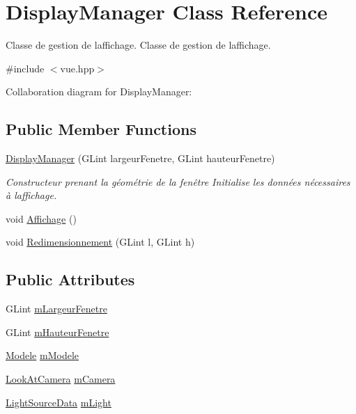\hypertarget{class_display_manager}{}\section{Display\+Manager Class Reference}
\label{class_display_manager}


Classe de gestion de l\textquotesingle{}affichage. Classe de gestion de l\textquotesingle{}affichage.  




{\ttfamily \#include $<$vue.\+hpp$>$}



Collaboration diagram for Display\+Manager\+:
\subsection*{Public Member Functions}
\begin{DoxyCompactItemize}
\item 
\hyperlink{class_display_manager_abf11523503126b8ee8ed26d79aba9974}{Display\+Manager} (G\+Lint largeur\+Fenetre, G\+Lint hauteur\+Fenetre)
\begin{DoxyCompactList}\small\item\em Constructeur prenant la géométrie de la fenêtre Initialise les données nécessaires à l\textquotesingle{}affichage. \end{DoxyCompactList}\item 
void \hyperlink{class_display_manager_a692eb24cc56a7ab15ab1fd5a88646a34}{Affichage} ()
\item 
void \hyperlink{class_display_manager_a5372587f56171ad81ac7c0ef686c61f4}{Redimensionnement} (G\+Lint l, G\+Lint h)
\end{DoxyCompactItemize}
\subsection*{Public Attributes}
\begin{DoxyCompactItemize}
\item 
G\+Lint \hyperlink{class_display_manager_a7078a2a1023ebe660ce2e3007a988a62}{m\+Largeur\+Fenetre}
\item 
G\+Lint \hyperlink{class_display_manager_a73b96e4ef8a0621077bcc83bc1dba2cf}{m\+Hauteur\+Fenetre}
\item 
\hyperlink{class_modele}{Modele} \hyperlink{class_display_manager_a0c8ba3fe8aece87fc924847fc8958398}{m\+Modele}
\item 
\hyperlink{class_look_at_camera}{Look\+At\+Camera} \hyperlink{class_display_manager_a17dd81e3974b51416a35c7e9d9232a60}{m\+Camera}
\item 
\hyperlink{struct_light_source_data}{Light\+Source\+Data} \hyperlink{class_display_manager_a012e14f7761f19a3d049aae93f5d694b}{m\+Light}
\end{DoxyCompactItemize}


